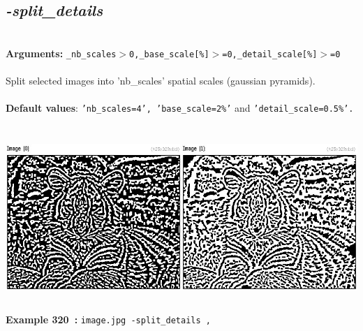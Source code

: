 \documentclass[a4paper,11pt,twoside]{book}
\begin{document}
\subsection{\emph{-split\_details} }\vspace*{-0.5em}
~\\\textbf{Arguments: } 
{\small \texttt{\_nb\_scales$>$0,\_base\_scale[\%]$>$=0,\_detail\_scale[\%]$>$=0}}\\~\\
Split selected images into 'nb\_scales' spatial scales (gaussian pyramids).
~\\~\\\textbf{Default values}: {\small \texttt{'nb\_scales=4', 'base\_scale=2\%'} and \texttt{'detail\_scale=0.5\%'.}}
\begin{center}\includegraphics[keepaspectratio=true,height=7cm,width=\textwidth]{img/gmic_def320.jpg}\\
{\footnotesize \textbf{Example 320~:} \texttt{image.jpg -split\_details ,}}
\end{center}
\end{document}
